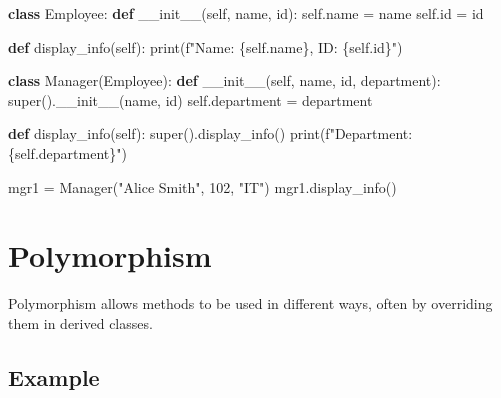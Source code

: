 \documentclass[
  letterpaper,
  DIV=11,
  numbers=noendperiod]{scrreprt}
\newenvironment{Shaded}{\begin{snugshade}}{\end{snugshade}}
\newcommand{\BuiltInTok}[1]{\textcolor[rgb]{0.00,0.23,0.31}{#1}}
\newcommand{\DecValTok}[1]{\textcolor[rgb]{0.68,0.00,0.00}{#1}}
\newcommand{\FunctionTok}[1]{\textcolor[rgb]{0.28,0.35,0.67}{#1}}
\newcommand{\KeywordTok}[1]{\textcolor[rgb]{0.00,0.23,0.31}{\textbf{#1}}}
\newcommand{\NormalTok}[1]{\textcolor[rgb]{0.00,0.23,0.31}{#1}}
\newcommand{\OperatorTok}[1]{\textcolor[rgb]{0.37,0.37,0.37}{#1}}
\newcommand{\SpecialCharTok}[1]{\textcolor[rgb]{0.37,0.37,0.37}{#1}}
\newcommand{\SpecialStringTok}[1]{\textcolor[rgb]{0.13,0.47,0.30}{#1}}
\newcommand{\StringTok}[1]{\textcolor[rgb]{0.13,0.47,0.30}{#1}}
\newcommand{\VariableTok}[1]{\textcolor[rgb]{0.07,0.07,0.07}{#1}}
\begin{document}
\begin{Shaded}
\begin{Highlighting}[]
\KeywordTok{class}\NormalTok{ Employee:}
    \KeywordTok{def} \FunctionTok{\_\_init\_\_}\NormalTok{(}\VariableTok{self}\NormalTok{, name, }\BuiltInTok{id}\NormalTok{):}
        \VariableTok{self}\NormalTok{.name }\OperatorTok{=}\NormalTok{ name}
        \VariableTok{self}\NormalTok{.}\BuiltInTok{id} \OperatorTok{=} \BuiltInTok{id}
    
    \KeywordTok{def}\NormalTok{ display\_info(}\VariableTok{self}\NormalTok{):}
        \BuiltInTok{print}\NormalTok{(}\SpecialStringTok{f"Name: }\SpecialCharTok{\{}\VariableTok{self}\SpecialCharTok{.}\NormalTok{name}\SpecialCharTok{\}}\SpecialStringTok{, ID: }\SpecialCharTok{\{}\VariableTok{self}\SpecialCharTok{.}\BuiltInTok{id}\SpecialCharTok{\}}\SpecialStringTok{"}\NormalTok{)}

\KeywordTok{class}\NormalTok{ Manager(Employee):}
    \KeywordTok{def} \FunctionTok{\_\_init\_\_}\NormalTok{(}\VariableTok{self}\NormalTok{, name, }\BuiltInTok{id}\NormalTok{, department):}
        \BuiltInTok{super}\NormalTok{().}\FunctionTok{\_\_init\_\_}\NormalTok{(name, }\BuiltInTok{id}\NormalTok{)}
        \VariableTok{self}\NormalTok{.department }\OperatorTok{=}\NormalTok{ department}
    
    \KeywordTok{def}\NormalTok{ display\_info(}\VariableTok{self}\NormalTok{):}
        \BuiltInTok{super}\NormalTok{().display\_info()}
        \BuiltInTok{print}\NormalTok{(}\SpecialStringTok{f"Department: }\SpecialCharTok{\{}\VariableTok{self}\SpecialCharTok{.}\NormalTok{department}\SpecialCharTok{\}}\SpecialStringTok{"}\NormalTok{)}

\NormalTok{mgr1 }\OperatorTok{=}\NormalTok{ Manager(}\StringTok{"Alice Smith"}\NormalTok{, }\DecValTok{102}\NormalTok{, }\StringTok{"IT"}\NormalTok{)}
\NormalTok{mgr1.display\_info()}
\end{Highlighting}
\end{Shaded}

\section{Polymorphism}\label{polymorphism-1}

Polymorphism allows methods to be used in different ways, often by
overriding them in derived classes.

\subsection{Example}\label{example-9}
\end{document}

